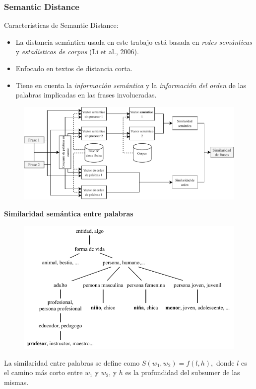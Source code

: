 \begin{frame}[allowframebreaks]
	\frametitle{Semantic Distance}
	Caracteristicas de Semantic Distance:
	\bigskip
	\begin{itemize}[<*>]
		\item La distancia semántica usada en este trabajo está basada en \textit{redes semánticas} y \textit{estadísticas de corpus} (Li et al., 2006).
		\item Enfocado en textos de distancia corta.
		\item Tiene en cuenta la \textit{información semántica} y la \textit{información del orden} de las palabras implicadas en las frases involucradas.
	\end{itemize}

	\begin{figure}
		\centering
		\includegraphics[width=0.7\linewidth]{../7_marco_teorico/imagenes/similaridad_sematinca_metodo}
		\label{fig:similaridadsematincametodo}
	\end{figure}

	\framebreak

	\textbf{Similaridad semántica entre palabras}
	\begin{figure}
		\centering
		\includegraphics[width=0.7\linewidth]{../7_marco_teorico/imagenes/taxonomia_semantica}
		\label{fig:taxonomiasemantica}
	\end{figure}

	\begin{scriptsize}
		La similaridad entre palabras se define como \(S(w_1,w_2)=f(l,h),\)
		donde \(l\) es el camino más corto entre \(w_1\) y \(w_2\), y \(h\) es la profundidad del subsumer de las mismas.
	\end{scriptsize}


\end{frame}
